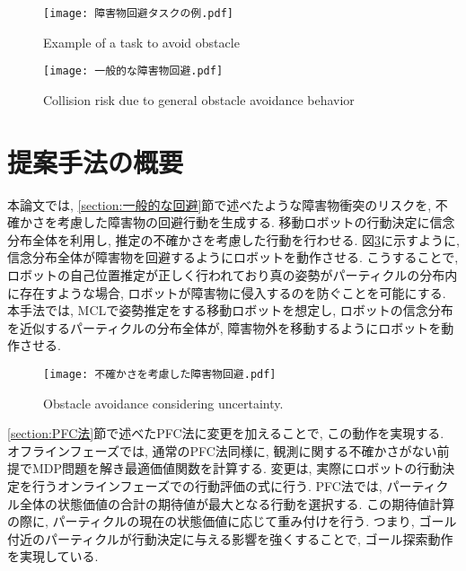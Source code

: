 \begin{figure}[H]
  \begin{center}
    \texttt{[image: 障害物回避タスクの例.pdf]}
    \caption{Example of a task to avoid obstacle}
    \label{fig:障害物回避タスクの例}
  \end{center}
\end{figure}

\begin{figure}[H]
  \begin{center}
    \texttt{[image: 一般的な障害物回避.pdf]}
    \caption{Collision risk due to general obstacle avoidance behavior}
    \label{fig:一般的な障害物回避}
  \end{center}
\end{figure}


\section{提案手法の概要} \label{section:method overview}
本論文では, \ref{section:一般的な回避}節で述べたような障害物衝突のリスクを, 
不確かさを考慮した障害物の回避行動を生成する. 
移動ロボットの行動決定に信念分布全体を利用し, 推定の不確かさを考慮した行動を行わせる. 
図\ref{fig:不確かさを考慮した障害物回避}に示すように, 
信念分布全体が障害物を回避するようにロボットを動作させる. 
こうすることで, ロボットの自己位置推定が正しく行われており真の姿勢がパーティクルの分布内に存在すような場合, 
ロボットが障害物に侵入するのを防ぐことを可能にする. 
本手法では, MCLで姿勢推定をする移動ロボットを想定し, 
ロボットの信念分布を近似するパーティクルの分布全体が, 障害物外を移動するようにロボットを動作させる. 

\begin{figure}[H]
  \begin{center}
    \texttt{[image: 不確かさを考慮した障害物回避.pdf]}
    \caption{Obstacle avoidance considering uncertainty.}
    \label{fig:不確かさを考慮した障害物回避}
  \end{center}
\end{figure}

\ref{section:PFC法}節で述べたPFC法に変更を加えることで, この動作を実現する. 
オフラインフェーズでは, 通常のPFC法同様に, 観測に関する不確かさがない前提でMDP問題を解き最適価値関数を計算する. 
変更は, 実際にロボットの行動決定を行うオンラインフェーズでの行動評価の式に行う. 
PFC法では, パーティクル全体の状態価値の合計の期待値が最大となる行動を選択する. 
この期待値計算の際に, パーティクルの現在の状態価値に応じて重み付けを行う. 
つまり, ゴール付近のパーティクルが行動決定に与える影響を強くすることで, ゴール探索動作を実現している. 

